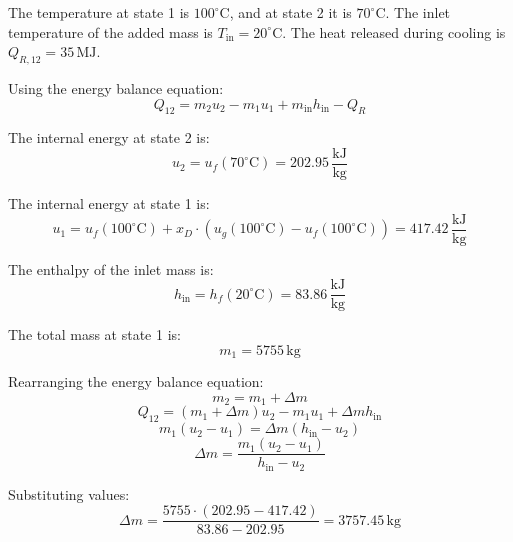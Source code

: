 The temperature at state 1 is \( 100^\circ\text{C} \), and at state 2 it is \( 70^\circ\text{C} \). The inlet temperature of the added mass is \( T_{\text{in}} = 20^\circ\text{C} \). The heat released during cooling is \( Q_{R,12} = 35 \, \text{MJ} \).  

Using the energy balance equation:  
\[
Q_{12} = m_2 u_2 - m_1 u_1 + m_{\text{in}} h_{\text{in}} - Q_R
\]  

The internal energy at state 2 is:  
\[
u_2 = u_f(70^\circ\text{C}) = 202.95 \, \frac{\text{kJ}}{\text{kg}}
\]  

The internal energy at state 1 is:  
\[
u_1 = u_f(100^\circ\text{C}) + x_D \cdot (u_g(100^\circ\text{C}) - u_f(100^\circ\text{C})) = 417.42 \, \frac{\text{kJ}}{\text{kg}}
\]  

The enthalpy of the inlet mass is:  
\[
h_{\text{in}} = h_f(20^\circ\text{C}) = 83.86 \, \frac{\text{kJ}}{\text{kg}}
\]  

The total mass at state 1 is:  
\[
m_1 = 5755 \, \text{kg}
\]  

Rearranging the energy balance equation:  
\[
m_2 = m_1 + \Delta m
\]  
\[
Q_{12} = (m_1 + \Delta m) u_2 - m_1 u_1 + \Delta m h_{\text{in}}
\]  
\[
m_1 (u_2 - u_1) = \Delta m (h_{\text{in}} - u_2)
\]  
\[
\Delta m = \frac{m_1 (u_2 - u_1)}{h_{\text{in}} - u_2}
\]  

Substituting values:  
\[
\Delta m = \frac{5755 \cdot (202.95 - 417.42)}{83.86 - 202.95} = 3757.45 \, \text{kg}
\]
